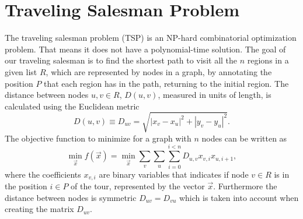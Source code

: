 \section{Traveling Salesman Problem}
The traveling salesman problem (TSP) is an NP-hard combinatorial optimization problem. That means it does not have a polynomial-time solution. The goal of our traveling salesman is to find the shortest path to visit all the $n$ regions in a given list $R$, which are represented by nodes in a graph, by annotating the position $P$ that each region has in the path, returning to the initial region. The distance between nodes $u,v \in R$, $D(u,v)$, measured in units of length, is calculated using the Euclidean metric
\begin{equation}
    D(u,v) \equiv D_{uv}= \sqrt{\left|x_{v} - x_{u}\right|^{2} + \left|y_{v} - y_{u} \right|^{2}}. 
\end{equation}
The objective function to minimize for a graph with $n$ nodes can be written as
\begin{equation}
\label{eq:TSP_noconstraints}
    \min_{\vec{x}} f(\vec{x}) = \min_{\vec{x}} \sum_{v} \sum_{u} \sum_{i=0}^{i<n}D_{u,v}x_{v,i}x_{u, i+1},
\end{equation}
where the coefficients $x_{v,i}$ are binary variables that indicates if node $v \in R$ is in the position $i\in P$ of the tour, represented by the vector $\vec{x}$. Furthermore the distance between nodes is symmetric $D_{uv} = D_{vu}$ which is taken into account when creating the matrix $D_{uv}$.
